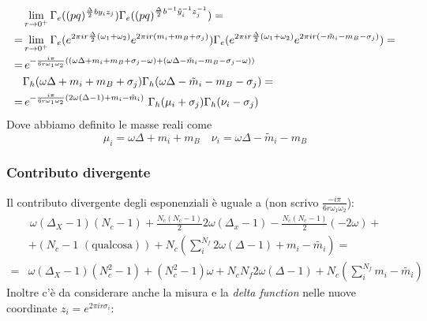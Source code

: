 \documentclass[a4paper,12pt]{article}
\begin{document}
\begin{align*}
& \lim_{r \rightarrow 0^+} \Gamma_e( 
(pq)^{\frac{\Delta}{2} b y_i z_j }) \Gamma_e( 
(pq)^{\frac{\Delta}{2} b^{-1} \tilde y_i^{-1} z_j^{-1} })  = \\
=& \lim_{r \rightarrow 0^+ } \Gamma_e( e^{2 \pi i  r  {\Delta \over 2} (\omega_1 + \omega_2)} e^{2 \pi i r ( m_i + m_B + \sigma_j) })\Gamma_e( e^{2 \pi i r  {\Delta \over 2} (\omega_1 + \omega_2)} e^{2 \pi i r ( -\tilde m_i - m_B - \sigma_j) }) = \\
= &  \,e^{- \frac{i \pi} {6 r \omega_1 \omega_2 }  ( ( \omega \Delta + m_i + m_B + \sigma_j -  \omega) + ( \omega \Delta -\tilde m_i - m_B - \sigma_j -  \omega))} \, \\
& \Gamma_h ( \omega \Delta + m_i + m_B + \sigma_j) \Gamma_h ( \omega \Delta - \tilde m_i - m_B - \sigma_j) = \\
=&\, e^{- \frac{i \pi} {6 r \omega_1 \omega_2 }  ( 2 \omega (\Delta - 1) + m_i - \tilde m_i )} \, \, \Gamma_h ( \mu_i + \sigma_j) \Gamma_h ( \nu_i - \sigma_j) 
\end{align*}
Dove abbiamo definito le masse reali come
$$
 \mu_i = \omega \Delta + m_i + m_B  \quad  \nu_i = \omega \Delta - \tilde m_i - m_B  
$$
\subsubsection{Contributo divergente}
Il contributo divergente degli esponenziali è uguale a (non scrivo $ \frac{- i \pi}{6 r \omega_1 \omega_2} $):
\begin{align*}
& \, \omega (\Delta_X - 1) ( N_c - 1) + \frac{N_c(N_c -1)}{2} 2 \omega(\Delta_x - 1) - \frac{N_c(N_c -1)}{2}  ( - 2 \omega)  +\\
&+ (N_c - 1  \, \,(\mbox{qualcosa} )) + N_c ( \sum_i^{N_f} 2 \omega(\Delta - 1 ) + m_i - \tilde{m_i}) = \\
= &  \omega (\Delta_X - 1) ( N_c^2 - 1) + (N_c^2 -1) \omega + N_c N_f 2 \omega(\Delta - 1) + N_c (\sum_{i}^{N_f}  m_i - \tilde{m_i} )
\end{align*}
Inoltre c'è da considerare anche la misura e la \emph{delta function} nelle nuove coordinate $ z_i = e^{2 \pi i r \sigma_i }$:
\end{document}
